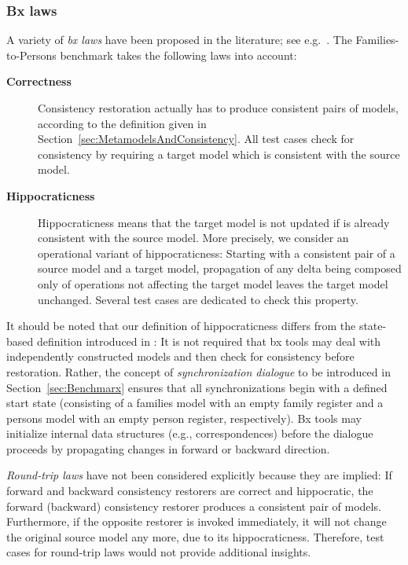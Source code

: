 \subsubsection{Bx laws}
\label{sec:BxLaws}

A variety of \emph{bx laws} have been proposed in the literature; see e.g.\ \cite{Cheney2015,Stevens2008c}. The Families-to-Persons benchmark takes the following laws into account:

\begin{description}
	\item[\textbf{Correctness}] Consistency restoration actually has to  produce consistent pairs of models, according to the definition given in Section~\ref{sec:MetamodelsAndConsistency}. All test cases check for consistency by requiring a target model which is consistent with the source model.
	\item[\textbf{Hippocraticness}] Hippocraticness means that the target model is not updated if is already consistent with the source model. More precisely, we consider an operational variant of hippocraticness: Starting with a consistent pair of a source model and a target model, propagation of any delta being composed only of operations not affecting the target model leaves the target model unchanged. Several test cases are dedicated to check this property.
\end{description}

It should be noted that our definition of hippocraticness differs from the state-based definition introduced in \cite{SOSYM-Stevens2010}: It is not required that bx tools may deal with independently constructed models and then check for consistency before restoration. Rather, the concept of \emph{synchronization dialogue} to be introduced in Section~\ref{sec:Benchmarx} ensures that all synchronizations begin with a defined start state (consisting of a families model with an empty family register and a persons model with an empty person register, respectively). Bx tools may initialize internal data structures (e.g., correspondences) before the dialogue proceeds by propagating changes in forward or backward direction.

\emph{Round-trip laws} have not been considered explicitly because they are implied: If forward and backward consistency restorers are correct and hippocratic, the forward (backward) consistency restorer produces a consistent pair of models. Furthermore, if the opposite restorer is invoked immediately, it will not change the original source model any more, due to its hippocraticness. Therefore, test cases for round-trip laws would not provide additional insights.

